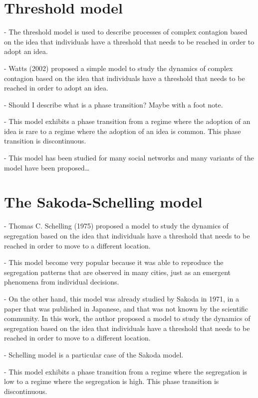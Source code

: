 \section{\label{sec:Threshold model} Threshold model}

- The threshold model is used to describe processes of complex contagion based on the idea that individuals have a threshold that needs to be reached in order to adopt an idea.

- Watts (2002) proposed a simple model to study the dynamics of complex contagion based on the idea that individuals have a threshold that needs to be reached in order to adopt an idea. 

- Should I describe what is a phase transition? Maybe with a foot note.

- This model exhibits a phase transition from a regime where the adoption of an idea is rare to a regime where the adoption of an idea is common. This phase transition is discontinuous.

- This model has been studied for many social networks and many variants of the model have been proposed\dots

\section{\label{The Sakoda-Schelling model} The Sakoda-Schelling model}

- Thomas C. Schelling (1975) proposed a model to study the dynamics of segregation based on the idea that individuals have a threshold that needs to be reached in order to move to a different location. 

- This model become very popular because it was able to reproduce the segregation patterns that are observed in many cities, just as an emergent phenomena from individual decisions.

- On the other hand, this model was already studied by Sakoda in 1971, in a paper that was published in Japanese, and that was not known by the scientific community. In this work, the author proposed a model to study the dynamics of segregation based on the idea that individuals have a threshold that needs to be reached in order to move to a different location.

- Schelling model is a particular case of the Sakoda model.

- This model exhibits a phase transition from a regime where the segregation is low to a regime where the segregation is high. This phase transition is discontinuous. 

